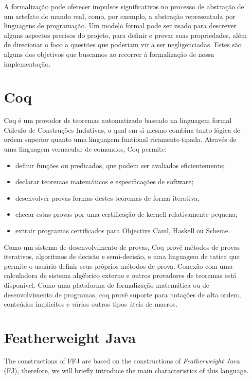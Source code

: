 A formalização pode oferecer impulsos significativos no processo de abstração de
um artefato do mundo real, como, por exemplo, a abstração representada por
linguagens de programação.  Um modelo formal pode ser usado para descrever
alguns aspectos precisos do projeto, para definir e provar suas propriedades,
além de direcionar o foco a questões que poderiam vir a ser negligenciadas.
Estes são alguns dos objetivos que buscamos ao recorrer à formalização de nossa
implementação.

    \section{Coq} Coq é um provador de teoremas automatizado  baseado na
    linguagem formal Calculo de Construções Indutivas\cite{coqart}, o qual em si
    mesmo combina tanto lógica de ordem superior quanto uma linguagem funtional
    ricamente-tipada. Através de uma linguagem vernacular de comandos, Coq
    permite: \begin{itemize} \item definir funções ou predicados, que podem ser
    avaliados eficientemente; \item declarar teoremas matemáticos e
    especificações de software; \item desenvolver provas formas destes teoremas
    de forma iterativa; \item checar estas provas por uma certificação de
    kernell relativamente pequena; \item extrair programas certificados para
    Objective Caml, Haskell ou Scheme.  \end{itemize} Como um sistema de
    desenvolvimento de provas, Coq provê métodos de provas iterativos,
    algoritmos de decisão e semi-decisão, e uma linguagem de tatica que permite
    o usuário definir seus próprios métodos de prova. Conexão com uma
    calculadora de sistema algébrico externo e outros provadores de teoremas
    está disponível.  Como uma plataforma de formalização matemática ou de
    desenvolvimento de programas, coq provê suporte para notações de alta ordem,
    conteúdos implicitos e vários outros tipos úteis de macros.

\section{Featherweight Java}

The constructions of FFJ are based on the constructions of \textit{Featherweight
Java} (FJ), therefore, we will briefly introduce the main characteristics of
this language.

